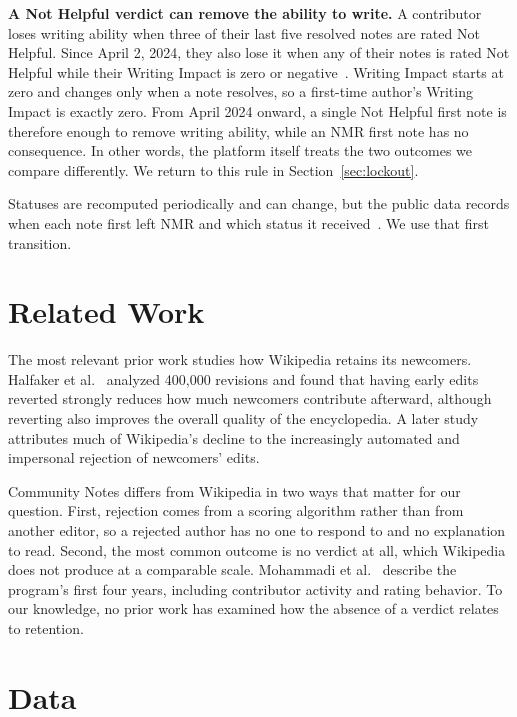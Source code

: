 \documentclass[sigconf,nonacm]{acmart}
\begin{document}
\textbf{A Not Helpful verdict can remove the ability to write.} A contributor loses writing
ability when three of their last five resolved notes are rated Not Helpful. Since April 2,
2024, they also lose it when any of their notes is rated Not Helpful while their Writing
Impact is zero or negative~\cite{communitynoteswriting}. Writing Impact starts at zero and
changes only when a note resolves, so a first-time author's Writing Impact is exactly zero.
From April 2024 onward, a single Not Helpful first note is therefore enough to remove
writing ability, while an NMR first note has no consequence. In other words, the platform
itself treats the two outcomes we compare differently. We return to this rule in
Section~\ref{sec:lockout}.

Statuses are recomputed periodically and can change, but the public data records when each
note first left NMR and which status it received~\cite{communitynotesranking}. We use that
first transition.

\section{Related Work}

The most relevant prior work studies how Wikipedia retains its newcomers. Halfaker et
al.~\cite{halfaker2011newbies} analyzed 400,000 revisions and found that having early edits
reverted strongly reduces how much newcomers contribute afterward, although reverting also
improves the overall quality of the encyclopedia. A later study~\cite{halfaker2013rise}
attributes much of Wikipedia's decline to the increasingly automated and impersonal
rejection of newcomers' edits.

Community Notes differs from Wikipedia in two ways that matter for our question. First,
rejection comes from a scoring algorithm rather than from another editor, so a rejected
author has no one to respond to and no explanation to read. Second, the most common outcome
is no verdict at all, which Wikipedia does not produce at a comparable scale. Mohammadi et
al.~\cite{mohammadi2025birdwatch} describe the program's first four years, including
contributor activity and rating behavior. To our knowledge, no prior work has examined how
the absence of a verdict relates to retention.

\section{Data}
\label{sec:data}
\end{document}
